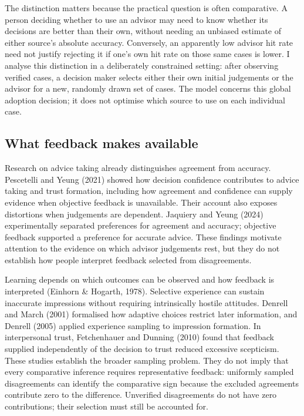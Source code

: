 \documentclass[
  british,
  11pt,
]{article}
\begin{document}
The distinction matters because the practical question is often
comparative. A person deciding whether to use an advisor may need to
know whether its decisions are better than their own, without needing an
unbiased estimate of either source's absolute accuracy. Conversely, an
apparently low advisor hit rate need not justify rejecting it if one's
own hit rate on those same cases is lower. I analyse this distinction in
a deliberately constrained setting: after observing verified cases, a
decision maker selects either their own initial judgements or the
advisor for a new, randomly drawn set of cases. The model concerns this
global adoption decision; it does not optimise which source to use on
each individual case.

\subsection{What feedback makes
available}\label{what-feedback-makes-available}

Research on advice taking already distinguishes agreement from accuracy.
Pescetelli and Yeung (2021) showed how decision confidence contributes
to advice taking and trust formation, including how agreement and
confidence can supply evidence when objective feedback is unavailable.
Their account also exposes distortions when judgements are dependent.
Jaquiery and Yeung (2024) experimentally separated preferences for
agreement and accuracy; objective feedback supported a preference for
accurate advice. These findings motivate attention to the evidence on
which advisor judgements rest, but they do not establish how people
interpret feedback selected from disagreements.

Learning depends on which outcomes can be observed and how feedback is
interpreted (Einhorn \& Hogarth, 1978). Selective experience can sustain
inaccurate impressions without requiring intrinsically hostile
attitudes. Denrell and March (2001) formalised how adaptive choices
restrict later information, and Denrell (2005) applied experience
sampling to impression formation. In interpersonal trust, Fetchenhauer
and Dunning (2010) found that feedback supplied independently of the
decision to trust reduced excessive scepticism. These studies establish
the broader sampling problem. They do not imply that every comparative
inference requires representative feedback: uniformly sampled
disagreements can identify the comparative sign because the excluded
agreements contribute zero to the difference. Unverified disagreements
do not have zero contributions; their selection must still be accounted
for.
\end{document}
